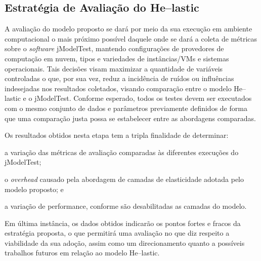 \documentclass[english,brazilian]{UNISINOSmonografia} %
\begin{document}
\subsection{Estratégia de Avaliação do \textsf{He}--lastic}
\label{sec:metodologia-etapas-modelo}



A avaliação do modelo proposto se dará por meio da sua execução em ambiente computacional o mais próximo possível daquele onde se dará a coleta de métricas sobre o \textit{software} jModelTest, mantendo configurações de provedores de computação em nuvem, tipos e variedades de instâncias/VMs e sistemas operacionais.
Tais decisões visam maximizar a quantidade de variáveis controladas o que, por sua vez, reduz a incidência de ruídos ou influências indesejadas nos resultados coletados, visando comparação entre o modelo \textsf{He}--lastic e o jModelTest.
Conforme esperado, todos os testes devem ser executados com o mesmo conjunto de dados e parâmetros previamente definidos de forma que uma comparação justa possa se estabelecer entre as abordagens comparadas.



Os resultados obtidos nesta etapa tem a tripla finalidade de determinar:
\begin{inparaenum}[\itshape 1\upshape)] 
	\item a variação das métricas de avaliação comparadas às diferentes execuções do jModelTest;  
	\item o \textit{overhead} causado pela abordagem de camadas de elasticidade adotada pelo modelo proposto; e
	\item a variação de performance, conforme são desabilitadas as camadas do modelo.
\end{inparaenum}
Em última instância, os dados obtidos indicarão os pontos fortes e fracos da estratégia proposta, o que permitirá uma avaliação no que diz respeito a viabilidade da sua adoção, assim como um direcionamento quanto a possíveis trabalhos futuros em relação ao modelo \textsf{He}--lastic.
\end{document}
